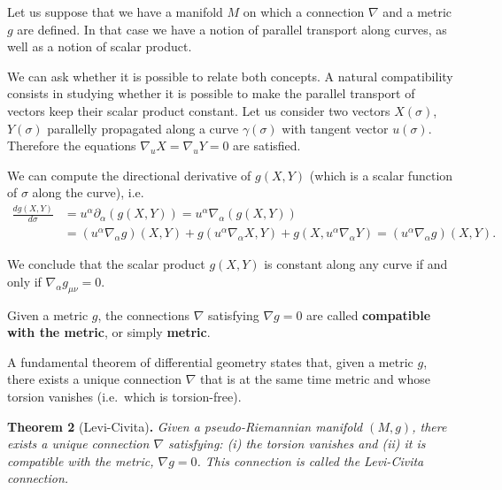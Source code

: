 \begin{points}
\item Let us suppose that we have a manifold $M$ on which a connection $\nabla$ and a metric $g$ are defined. In that case we have a notion of parallel transport along curves, as well as a notion of scalar product.

\item We can ask whether it is possible to relate both concepts. A natural compatibility consists in studying whether it is possible to make the parallel transport of vectors keep their scalar product constant. Let us consider two vectors $X(\sigma)$, $Y(\sigma)$ parallelly propagated along a curve $\gamma(\sigma)$ with tangent vector $u(\sigma)$. Therefore the equations $\nabla_uX=\nabla_uY=0$ are satisfied.

\item We can compute the directional derivative of $g(X,Y)$ (which is a scalar function of $\sigma$ along the curve), i.e.
\begin{align*}
  \frac{dg(X,Y)}{d\sigma}&=u^\alpha\partial_\alpha(g(X,Y))=u^\alpha\nabla_\alpha(g(X,Y))\\
  &=\left(u^\alpha\nabla_\alpha g\right)(X,Y)+g(u^\alpha\nabla_\alpha X,Y)+g(X,u^\alpha\nabla_\alpha Y)=\left(u^\alpha\nabla_\alpha g\right)(X,Y).
\end{align*}

\item We conclude that the scalar product $g(X,Y)$ is constant along any curve if and only if $\nabla_\alpha g_{\mu\nu}=0$.

\item Given a metric $g$, the connections $\nabla$ satisfying $\nabla g=0$ are called \textbf{compatible with the metric}, or simply \textbf{metric}.

\item A fundamental theorem of differential geometry states that, given a metric $g$, there exists a unique connection $\nabla$ that is at the same time metric and whose torsion vanishes (i.e.\ which is torsion-free).
\end{points}

\textbf{Theorem 2} (Levi-Civita)\textbf{.} \emph{Given a pseudo-Riemannian manifold $(M,g)$, there exists a unique connection $\nabla$ satisfying: (i) the torsion vanishes and (ii) it is compatible with the metric, $\nabla g=0$. This connection is called the Levi-Civita connection.}

